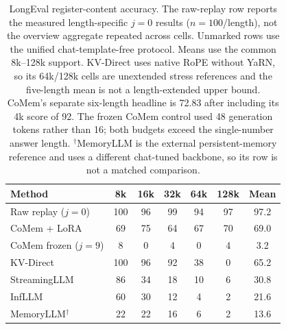 \begin{table}[!htbp]
\centering
\small
\setlength{\tabcolsep}{4pt}
\begin{tabular}{@{}lcccccc@{}}
\toprule
\textbf{Method} & \textbf{8k} & \textbf{16k} & \textbf{32k} & \textbf{64k} & \textbf{128k} & \textbf{Mean} \\
\midrule
Raw replay ($j{=}0$) & 100 & 96 & 99 & 94 & 97 & 97.2 \\
CoMem + LoRA & 69 & 75 & 64 & 67 & 70 & 69.0 \\
CoMem frozen ($j{=}9$) & 8 & 0 & 4 & 0 & 4 & 3.2 \\
KV-Direct & 100 & 96 & 92 & 38 & 0 & 65.2 \\
StreamingLLM & 86 & 34 & 18 & 10 & 6 & 30.8 \\
InfLLM & 60 & 30 & 12 & 4 & 2 & 21.6 \\
MemoryLLM$^{\dagger}$ & 22 & 22 & 16 & 6 & 2 & 13.6 \\
\bottomrule
\end{tabular}
\caption{LongEval register-content accuracy. The raw-replay row reports the
measured length-specific $j{=}0$ results ($n{=}100$/length), not the overview
aggregate repeated across cells. Unmarked rows use the unified chat-template-free
protocol. Means use the common 8k--128k support. KV-Direct
uses native RoPE without YaRN, so its 64k/128k cells are unextended stress
references and the five-length mean is not a length-extended upper bound.
CoMem's separate six-length headline is 72.83 after
including its 4k score of 92. The frozen CoMem control used 48 generation
tokens rather than 16; both budgets exceed the single-number answer length.
$^{\dagger}$MemoryLLM is the external persistent-memory reference and uses a
different chat-tuned backbone, so its row is not a matched comparison.}
\label{tab:longeval}
\end{table}
